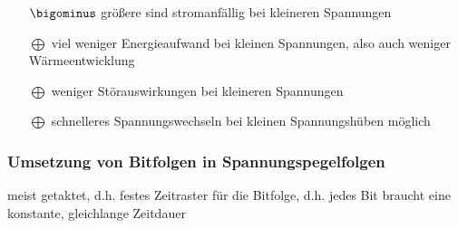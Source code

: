 \documentclass[10pt,a4paper]{scrartcl}
\begin{document}
\begin{itemize}
	\item[$\bigominus$] größere sind stromanfällig bei kleineren Spannungen
	\item[$\bigoplus$] viel weniger Energieaufwand bei kleinen Spannungen, also auch weniger Wärmeentwicklung
	\item[$\bigoplus$] weniger Störauswirkungen bei kleineren Spannungen
	\item[$\bigoplus$] schnelleres Spannungswechseln bei kleinen Spannungshüben möglich
\end{itemize}

\subsubsection{Umsetzung von Bitfolgen in Spannungspegelfolgen}
\hspace*{2em} meist getaktet, d.h. festes Zeitraster für die Bitfolge, d.h. jedes Bit braucht eine konstante, gleichlange Zeitdauer
\end{document}
